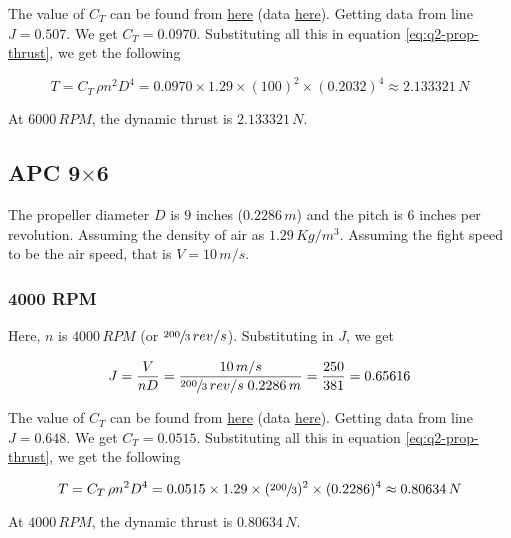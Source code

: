 The value of $C_T$ can be found from \href{https://m-selig.ae.illinois.edu/props/volume-1/plots/apcsf_8x6_ct.png}{here} (data \href{https://m-selig.ae.illinois.edu/props/volume-1/data/apcsf_8x6_2788rd_6009.txt}{here}). Getting data from line $J = 0.507$. We get $C_T = 0.0970$. Substituting all this in equation \ref{eq:q2-prop-thrust}, we get the following

\begin{equation*}
    T = C_T \, \rho n^2 D^4 = 0.0970 \times 1.29 \times (100)^2 \times (0.2032)^4 \approx 2.133321\,N
\end{equation*}

At $6000\,RPM$, the dynamic thrust is $2.133321\,N$.

\subsection{APC 9\texorpdfstring{$\times$}{by}6}

The propeller diameter $D$ is $9$ inches ($0.2286\,m$) and the pitch is $6$ inches per revolution. Assuming the density of air as $1.29\,Kg/m^3$.
Assuming the fight speed to be the air speed, that is $V = 10\,m/s$.

\subsubsection*{4000 RPM}

Here, $n$ is $4000\,RPM$ (or $\sfrac{200}{3}\,rev/s$). Substituting in $J$, we get

\begin{equation*}
    J = \frac{V}{nD} = \frac{10\,m/s}{\sfrac{200}{3}\,rev/s \; 0.2286\,m} = \frac{250}{381} = 0.65616
\end{equation*}

The value of $C_T$ can be found from \href{https://m-selig.ae.illinois.edu/props/volume-1/plots/apcsf_9x6_ct.png}{here} (data \href{https://m-selig.ae.illinois.edu/props/volume-1/data/apcsf_9x6_kt0980_4016.txt}{here}). Getting data from line $J=0.648$. We get $C_T=0.0515$. Substituting all this in equation \ref{eq:q2-prop-thrust}, we get the following

\begin{equation*}
    T = C_T \, \rho n^2 D^4 = 0.0515 \times 1.29 \times (\sfrac{200}{3})^2 \times (0.2286)^4 \approx 0.80634\,N
\end{equation*}

At $4000\,RPM$, the dynamic thrust is $0.80634\,N$.

